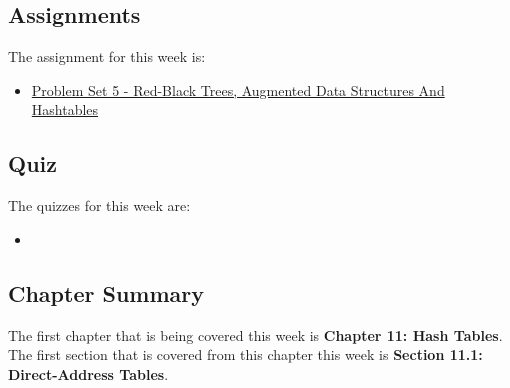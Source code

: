\subsection{Assignments}

The assignment for this week is:

\begin{itemize}
    \item \href{https://github.com/QuantumCompiler/CU/tree/main/CSPB%203104%20-%20Algorithms/Assignments/Problem%20Sets/Problem%20Set%205%20-%20Red-Black%20Trees%2C%20Augmented%20Data%20Structures%20And%20Hashtables}{Problem Set 5 - Red-Black Trees, Augmented Data Structures And Hashtables}
\end{itemize}

\subsection{Quiz}

The quizzes for this week are:

\begin{itemize}
    \item {}
\end{itemize}

\newpage

\subsection{Chapter Summary}

The first chapter that is being covered this week is \textbf{Chapter 11: Hash Tables}. The first section that is covered from this chapter this week is \textbf{Section 11.1: Direct-Address Tables}.

